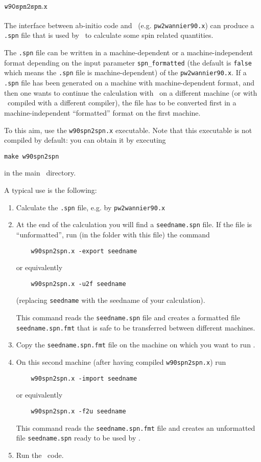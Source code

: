 \section{$\tt{w90spn2spn.x}$\label{sec:w90spn2spn}}
The interface between ab-initio code and \wannier\ 
(e.g. \texttt{pw2wannier90.x}) can produce a
\verb|.spn| file that is used by \postw\ to 
calculate some spin related quantities.

The \verb|.spn| file can be 
written in a machine-dependent or a machine-independent format 
depending on the input parameter \texttt{spn\_formatted} 
(the default is \texttt{false} which means the \verb|.spn| file 
is machine-dependent) of the 
\texttt{pw2wannier90.x}. If a \verb|.spn| file has been generated 
on a machine with machine-dependent format, 
and then one wants to continue the calculation 
with \postw\ on a different machine 
(or with \postw\ compiled with a different compiler), 
the file has to be converted first in a machine-independent 
``formatted'' format on the first machine. 

To this aim, use the \verb|w90spn2spn.x| executable. Note that this
executable is not compiled by default: you can obtain it by executing 
\begin{verbatim}
make w90spn2spn
\end{verbatim}
in the main \wannier\ directory.

A typical use is the following:
\begin{enumerate}
	\item Calculate the \verb|.spn| file, e.g. by \texttt{pw2wannier90.x}
	\item At the end of the calculation you will find a \verb|seedname.spn|
	file. If the file is ``unformatted'', run (in the folder with this file) the command
	\begin{verbatim}
	w90spn2spn.x -export seedname
	\end{verbatim}
	or equivalently
	\begin{verbatim}
	w90spn2spn.x -u2f seedname
	\end{verbatim}
	(replacing \verb|seedname| with the seedname of your calculation).
	
	This command reads the \verb|seedname.spn| file and creates a
	formatted file  \verb|seedname.spn.fmt| that is safe to be transferred
	between different machines.
	\item Copy the \verb|seedname.spn.fmt| file on the machine on
	which you want to run \postw.
	\item On this second machine (after having compiled
	\verb|w90spn2spn.x|) run
	\begin{verbatim}
	w90spn2spn.x -import seedname
	\end{verbatim}
	or equivalently
	\begin{verbatim}
	w90spn2spn.x -f2u seedname
	\end{verbatim}
	
	This command reads the \verb|seedname.spn.fmt| file and creates an
	unformatted file \verb|seedname.spn| ready to be used by \postw.
	
	\item Run the \postw\ code.
	
\end{enumerate}

